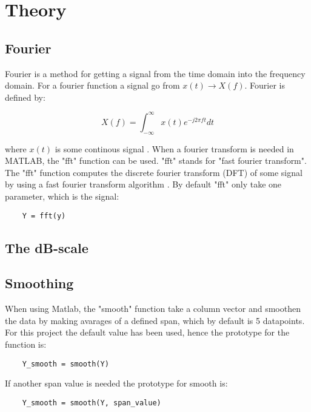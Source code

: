 \section{Theory}

\subsection{Fourier}

Fourier is a method for getting a signal from the time domain into the frequency domain. For a fourier function a signal go from $x(t) \rightarrow X(f)$. Fourier is defined by:

\begin{equation}
X(f) = \int_{-\infty}^{\infty} x(t)e^{-j2\pi ft}dt
\end{equation}

where $x(t)$ is some continous signal \cite[p. 53]{DSP}. When a fourier transform is needed in MATLAB, the "fft" function can be used. "fft" stands for "fast fourier transform". The "fft" function computes the discrete fourier transform (DFT) of some signal by using a fast fourier transform algorithm \cite[fft]{MATLAB_DOC}. By default "fft" only take one parameter, which is the signal:

\begin{verbatim}
	Y = fft(y)
\end{verbatim}

\subsection{The dB-scale}

\subsection{Smoothing}

When using Matlab, the "smooth" function take a column vector and smoothen the data by making avarages of a defined span, which by default is 5 datapoints\cite[smooth]{MATLAB_DOC}. For this project the default value has been used, hence the prototype for the function is:

\begin{verbatim}
	Y_smooth = smooth(Y)
\end{verbatim}

If another span value is needed the prototype for smooth is:


\begin{verbatim}
	Y_smooth = smooth(Y, span_value)
\end{verbatim}


